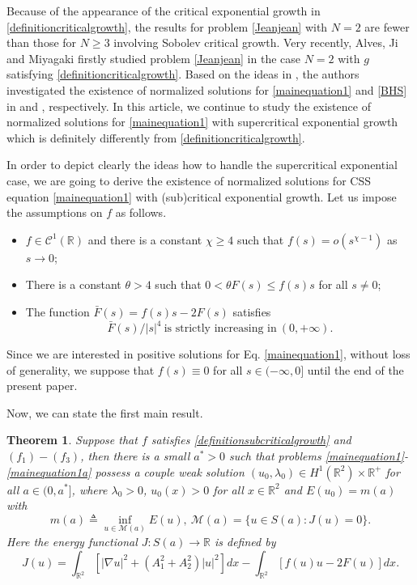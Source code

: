 \documentclass[11pt]{amsart}
\numberwithin{equation}{section}
\newtheorem{theorem}{Theorem}[section]
\theoremstyle{definition}
\newcommand{\R}{\mathbb{R}}
\begin{document}
Because of the appearance of the critical exponential growth in \eqref{definitioncriticalgrowth},
the results for problem \eqref{Jeanjean} with $N=2$ are fewer than
those for $N\geq3$ involving Sobolev critical growth. Very recently, Alves, Ji and Miyagaki \cite{AJM}
firstly studied problem \eqref{Jeanjean} in the case $N=2$ with $g$ satisfying \eqref{definitioncriticalgrowth}.
Based on the ideas in \cite{AJM}, the authors investigated the existence of normalized solutions for
\eqref{mainequation1} and \eqref{BHS} in \cite{YCS1} and \cite{YTC}, respectively.
In this article, we continue to study the existence of normalized solutions for \eqref{mainequation1}
with supercritical exponential growth which is definitely differently from \eqref{definitioncriticalgrowth}.

In order to depict clearly the ideas how to handle the supercritical exponential case,
we are going to derive the existence of normalized solutions for CSS equation \eqref{mainequation1}
with (sub)critical exponential growth. Let us impose the assumptions on $f$ as follows.
\begin{itemize}
	\item[$(f_1)$] $f \in \mathcal{C}^1(\mathbb{R})$ and
	there is a constant $\chi\geq4$ such that $f(s)=o(s^{\chi-1})$ as $s\to0$;
	\item[$(f_2)$] There is a constant $\theta>4$ such that $0<\theta F(s)\leq  f(s)s$ for all $s\neq0$;
	\item[$(f_3)$] The function $\bar{F}(s)=f(s)s-2F(s)$ satisfies
	\[
	\bar{F}(s)/|s|^{4}~\text{is strictly increasing in}~(0,+\infty).
	\]
\end{itemize}

Since we are interested in positive solutions for Eq. \eqref{mainequation1}, without loss of generality, we
suppose that $f(s)\equiv0$ for all $s\in(-\infty,0]$ until the end of the present paper.

Now, we can state the first main result.

\begin{theorem}\label{maintheorem1}
	Suppose that $f$ satisfies \eqref{definitionsubcriticalgrowth} and $(f_1)-(f_3)$,
	then there is a small $a^*>0$ such that problems \eqref{mainequation1}-\eqref{mainequation1a}
	possess a couple weak solution $(u_0,\lambda_0)\in H^1(\R^2)\times\R^+$ for all $a\in(0,a^*]$,
	where $\lambda_0>0$, $u_0(x)>0$ for all $x\in\R^2$ and $E(u_0)=m(a)$ with
	\begin{equation}\label{minimization}
		m(a)\triangleq \inf_{u\in \mathcal{M}(a)}E(u),~\mathcal{M}(a)=\big\{u\in S(a):J(u)=0\big\}.
	\end{equation}
	Here the energy functional $J:S(a)\to\R$ is defined by
	\[
	J(u)= \int_{\R^2}[|\nabla u|^2 + (A_1^2+A_2^2)|u|^2]dx-\int_{\R^2}[f(u)u-2F(u)]dx.
	\]
\end{theorem}
\end{document}
